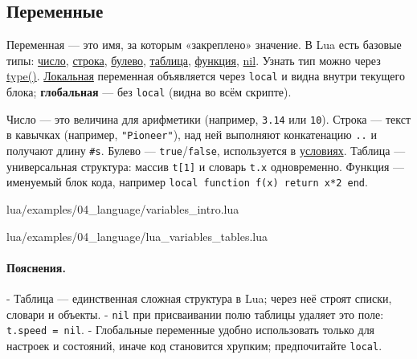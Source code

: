 \subsection{Переменные}
Переменная — это имя, за которым «закреплено» значение. В Lua есть базовые типы: \hyperlink{term:number}{число}, \hyperlink{term:string}{строка}, \hyperlink{term:boolean}{булево}, \hyperlink{term:table}{таблица}, \hyperlink{term:function}{функция}, \hyperlink{term:nil}{nil}. Узнать тип можно через \hyperlink{term:type}{type()}. \hyperlink{term:scope}{Локальная} переменная объявляется через \verb|local| и видна внутри текущего блока; \textbf{глобальная} — без \verb|local| (видна во всём скрипте).

Число — это величина для арифметики (например, \verb|3.14| или \verb|10|). Строка — текст в кавычках (например, \verb|"Pioneer"|), над ней выполняют конкатенацию \verb|..| и получают длину \verb|#s|. Булево — \verb|true|/\verb|false|, используется в \hyperlink{term:condition}{условиях}. Таблица — универсальная структура: массив \verb|t[1]| и словарь \verb|t.x| одновременно. Функция — именуемый блок кода, например \verb|local function f(x) return x*2 end|.

\begin{codefile}{lua/examples/04_language/variables_intro.lua}
\end{codefile}
\begin{codefile}{lua/examples/04_language/lua_variables_tables.lua}
\end{codefile}
\paragraph{Пояснения.}
- Таблица — единственная сложная структура в Lua; через неё строят списки, словари и объекты.
- \verb|nil| при присваивании полю таблицы удаляет это поле: \verb|t.speed = nil|.
- Глобальные переменные удобно использовать только для настроек и состояний, иначе код становится хрупким; предпочитайте \verb|local|.


